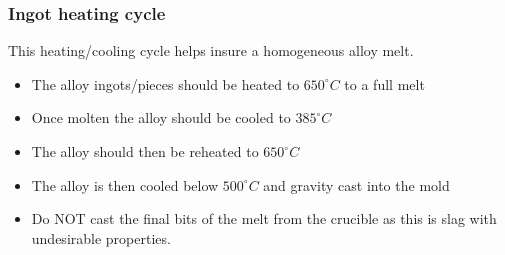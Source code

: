 \subsubsection{Ingot heating cycle}

This heating/cooling cycle helps insure a homogeneous alloy melt.
\begin{itemize}
\item The \MgZnCa alloy ingots/pieces should be heated to $650^{\circ}C$ to a full melt
\item Once molten the alloy should be cooled to $385^{\circ}C$
\item The alloy should then be reheated to $650^{\circ}C$
\item The alloy is then cooled below $500^{\circ}C$ and gravity cast into the mold
\item Do NOT cast the final bits of the melt from the crucible as this is slag with undesirable properties. 
\end{itemize}
